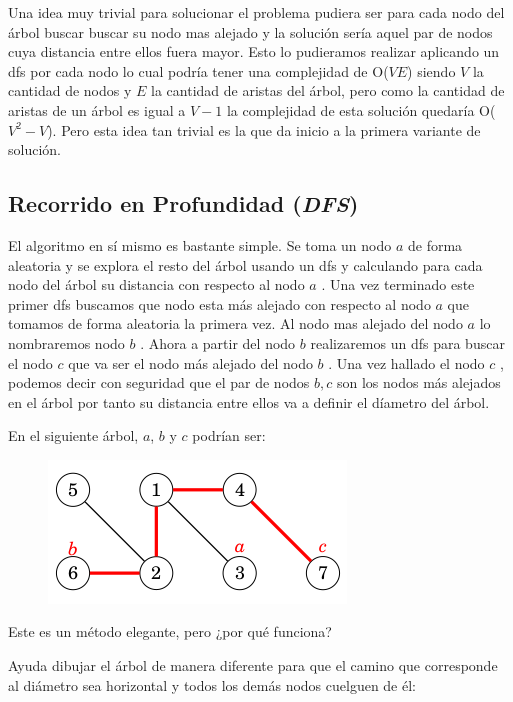Una idea muy trivial para solucionar el problema pudiera ser para cada nodo del árbol buscar buscar su nodo mas alejado y la solución sería aquel par de nodos cuya distancia entre ellos fuera mayor. Esto lo pudieramos realizar aplicando un dfs por cada nodo lo cual podría tener una complejidad de O($VE$) siendo $V$ la cantidad de nodos y $E$ la cantidad de aristas del árbol, pero como la cantidad de aristas de un árbol es igual a $V-1$ la complejidad de esta solución quedaría O($V^2-V$). Pero esta idea tan trivial es la que da inicio a la primera variante de solución.

\subsection{Recorrido en Profundidad (\emph{DFS})}

El algoritmo en sí mismo es bastante simple. Se toma un nodo $a$ de forma aleatoria y se explora el resto del árbol usando un dfs y calculando para cada nodo del árbol su distancia con respecto al nodo $a$ . Una vez terminado este primer dfs buscamos que nodo esta más alejado con respecto al nodo $a$  que tomamos de forma aleatoria la primera vez. Al nodo mas alejado del nodo $a$  lo nombraremos nodo $b$ . Ahora a partir del nodo $b$  realizaremos un dfs para buscar el nodo $c$  que va ser el nodo más alejado del nodo $b$ . Una vez hallado el nodo $c$ , podemos decir con seguridad que el par de nodos $b,c$  son los nodos más alejados en el árbol por tanto su distancia entre ellos va a definir el díametro del árbol.

En el siguiente árbol, $a$, $b$ y $c$ podrían ser:

\begin{figure}[h!]
	\centering
	\includegraphics[width=0.5\linewidth]{img/diameter_tree_3}
	\label{fig:diametertree3}
\end{figure}

Este es un método elegante, pero ¿por qué funciona?

Ayuda dibujar el árbol de manera diferente para que el camino que corresponde al diámetro sea horizontal y todos los demás nodos cuelguen de él:

